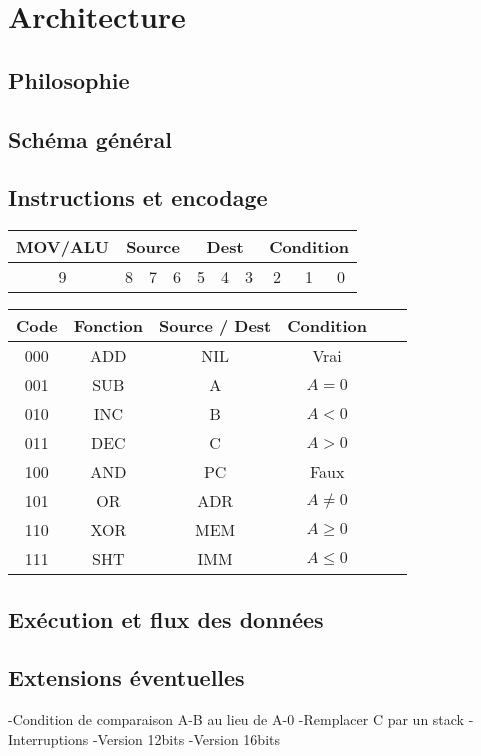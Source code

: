 
\chapter{Architecture}


	\section{Philosophie}

	\section{Schéma général}

	\section{Instructions et encodage}

		\begin{center}
		    \begin{tabular}{ |c|c|c|c|c|c|c|c|c|c| }
		     \hline
		     MOV/ALU & \multicolumn{3}{c|}{Source} & \multicolumn{3}{c|}{Dest} & \multicolumn{3}{c|}{Condition} \\
		     \hline
		     9 & 8 & 7 & 6 & 5 & 4 & 3 & 2 & 1 & 0\\
		     \hline		     
		    \end{tabular}
	  	\end{center}


		\begin{center}
		    \begin{tabular}{ |c||c|c|c|c|c| }
		     \hline
		     Code & Fonction & Source / Dest & Condition \\
		     \hline
		     000  & ADD & NIL & Vrai\\
		     \hline
		     001  & SUB & A   & $A=0$\\
		     \hline
		     010  & INC & B   & $A<0$\\
		     \hline
		     011  & DEC & C   & $A>0$\\
		     \hline
		     100  & AND & PC  & Faux\\
		     \hline
		     101  & OR  & ADR & $A\neq0$\\
		     \hline
		     110  & XOR & MEM & $A\geq0$\\
		     \hline
		     111  & SHT & IMM & $A\leq0$\\
		     \hline
		    \end{tabular}
	  	\end{center}



	\section{Exécution et flux des données}

	\section{Extensions éventuelles}

		-Condition de comparaison A-B au lieu de A-0
		-Remplacer C par un stack
		-Interruptions
		-Version 12bits
		-Version 16bits